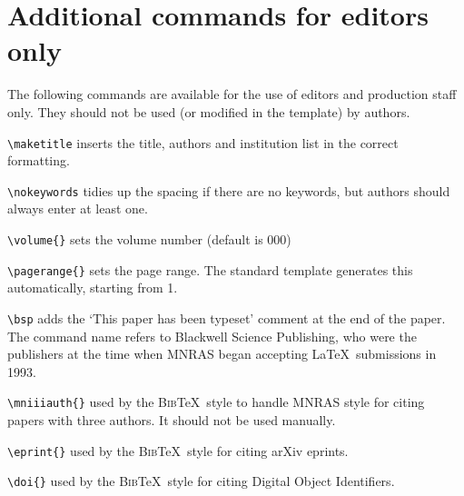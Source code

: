 \documentclass[fleqn,usenatbib,useAMS]{mnras}
\newcommand{\bibtex}{\textsc{Bib}\!\TeX} %
\begin{document}
\section{Additional commands for editors only}
The following commands are available for the use of editors and production staff only.
They should not be used (or modified in the template) by authors.

\begin{description}
 \item \verb'\maketitle' inserts the title, authors and institution list in the correct formatting.
 \item \verb'\nokeywords' tidies up the spacing if there are no keywords, but authors should always enter at least one.
 \item \verb'\volume{}' sets the volume number (default is 000)
 \item \verb'\pagerange{}' sets the page range. The standard template generates this automatically, starting from 1.
 \item \verb'\bsp' adds the `This paper has been typeset\textellipsis' comment at the end of the paper.
The command name refers to Blackwell Science Publishing, who were the publishers at the time when MNRAS began accepting \LaTeX\ submissions in 1993.
 \item \verb'\mniiiauth{}' used by the \bibtex\ style to handle MNRAS style for citing papers with three authors. It should not be used manually.
 \item \verb'\eprint{}' used by the \bibtex\ style for citing arXiv eprints.
 \item \verb'\doi{}' used by the \bibtex\ style for citing Digital Object Identifiers.
\end{description}



\bsp	%
\label{lastpage}
\end{document}
